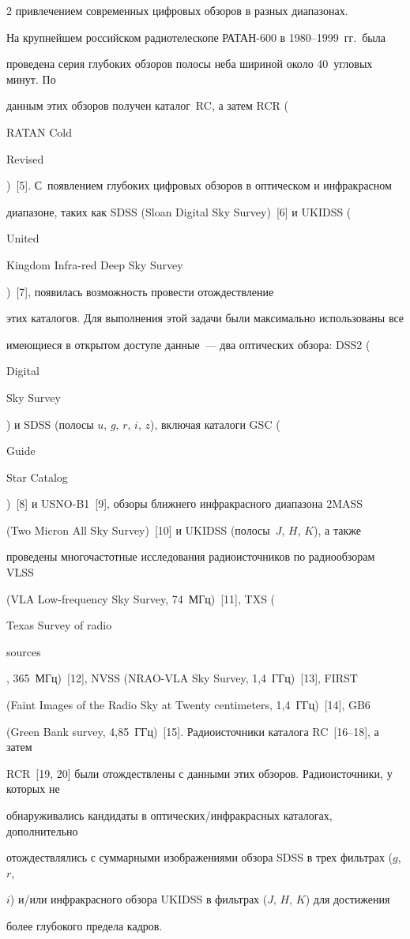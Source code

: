 \begin{multicols}{2}
привлечением современных цифровых обзоров в разных диапазонах. 

      

      На крупнейшем российском радиотелескопе РАТАН-600 в 1980--1999~гг.\ была 

проведена серия глубоких обзоров полосы неба шириной около 40~угловых минут. По 

данным этих обзоров получен каталог~RC, а затем RCR ({RATAN Cold 

Revised})~[5]. С~появлением глубоких цифровых обзоров в оптическом и инфракрасном 

диапазоне, таких как SDSS ({Sloan Digital Sky Survey})~[6] и UKIDSS ({United 

Kingdom Infra-red Deep Sky Survey})~[7], появилась возможность провести отождествление 

этих каталогов. Для выполнения этой задачи были максимально использованы все 

имеющиеся в открытом доступе данные~--- два оптических обзора: DSS2 ({Digital 

Sky Survey}) и SDSS (полосы $u$, $g$, $r$, $i$, $z$), включая каталоги GSC ({Guide 

Star Catalog})~[8] и USNO-B1~[9], обзоры ближнего инфракрасного диапазона 2MASS 

({Two Micron All Sky Survey})~[10] и UKIDSS (полосы~$J$, $H$, $K$), а также 

проведены многочастотные исследования радиоисточников по радиообзорам VLSS 

({VLA Low-frequency Sky Survey}, 74~МГц)~[11], TXS ({Texas Survey of radio 

sources}, 365~МГц)~[12], NVSS ({NRAO-VLA Sky Survey}, 1,4~ГГц)~[13], FIRST 

({Faint Images of the Radio Sky at Twenty centimeters}, 1,4~ГГц)~[14], GB6 

({Green Bank survey}, 4,85~ГГц)~[15]. Радиоисточники каталога RC~[16--18], а затем 

RCR~[19, 20] были отождествлены с данными этих обзоров. Радиоисточники, у которых не 

обнаруживались кандидаты в оптических/инфракрасных каталогах, дополнительно 

отождествлялись с суммарными изображениями обзора SDSS в трех фильтрах ($g$, $r$, 

$i$) и/или инфракрасного обзора UKIDSS в фильтрах ($J$, $H$, $K$) для достижения 

более глубокого предела кадров. 


\end{multicols}
